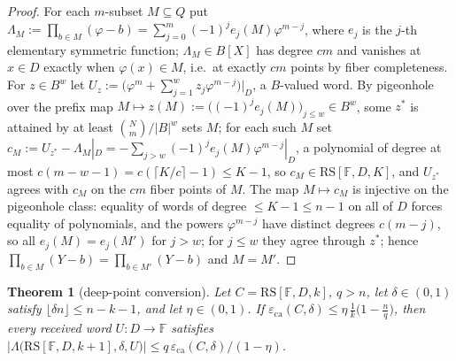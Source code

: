\documentclass[11pt]{amsart}
\newtheorem{theorem}{Theorem}[section]
\theoremstyle{definition}
\theoremstyle{remark}
\newcommand{\F}{\mathbb{F}}
\newcommand{\RS}{\mathrm{RS}}
\newcommand{\eca}{\varepsilon_{\mathrm{ca}}}
\newcommand{\Lst}{\Lambda}
\begin{document}
\begin{proof}
For each $m$-subset $M\subseteq Q$ put $\Lambda_M:=\prod_{b\in M}(\varphi-b)=\sum_{j=0}^m(-1)^je_j(M)\varphi^{m-j}$, where $e_j$ is the $j$-th elementary symmetric function; $\Lambda_M\in B[X]$ has degree $cm$ and vanishes at $x\in D$ exactly when $\varphi(x)\in M$, i.e.\ at exactly $cm$ points by fiber completeness. For $z\in B^w$ let $U_z:=\bigl(\varphi^m+\sum_{j=1}^wz_j\varphi^{m-j}\bigr)\big|_D$, a $B$-valued word. By pigeonhole over the prefix map $M\mapsto z(M):=\bigl((-1)^je_j(M)\bigr)_{j\le w}\in B^w$, some $z^*$ is attained by at least $\binom Nm/|B|^w$ sets $M$; for each such $M$ set $c_M:=U_{z^*}-\Lambda_M|_D=-\sum_{j>w}(-1)^je_j(M)\varphi^{m-j}|_D$, a polynomial of degree at most $c(m-w-1)=c(\lceil K/c\rceil-1)\le K-1$, so $c_M\in\RS[\F,D,K]$, and $U_{z^*}$ agrees with $c_M$ on the $cm$ fiber points of $M$. The map $M\mapsto c_M$ is injective on the pigeonhole class: equality of words of degree $\le K-1\le n-1$ on all of $D$ forces equality of polynomials, and the powers $\varphi^{m-j}$ have distinct degrees $c(m-j)$, so all $e_j(M)=e_j(M')$ for $j>w$; for $j\le w$ they agree through $z^*$; hence $\prod_{b\in M}(Y-b)=\prod_{b\in M'}(Y-b)$ and $M=M'$.
\end{proof}

\begin{theorem}[deep-point conversion]\label{thm:conversion}
Let $C=\RS[\F,D,k]$, $q>n$, let $\delta\in(0,1)$ satisfy $\lfloor\delta n\rfloor\le n-k-1$, and let $\eta\in(0,1)$. If $\eca(C,\delta)\le\eta\,\frac1k\bigl(1-\frac nq\bigr)$, then every received word $U\colon D\to\F$ satisfies $\bigl|\Lst\bigl(\RS[\F,D,k+1],\delta,U\bigr)\bigr|\le q\,\eca(C,\delta)/(1-\eta)$.
\end{theorem}
\end{document}
